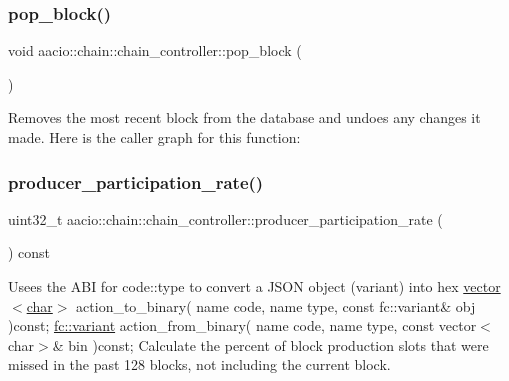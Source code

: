 \subsubsection{\texorpdfstring{pop\+\_\+block()}{pop\_block()}}
{\footnotesize\ttfamily void aacio\+::chain\+::chain\+\_\+controller\+::pop\+\_\+block (\begin{DoxyParamCaption}{ }\end{DoxyParamCaption})}

Removes the most recent block from the database and undoes any changes it made. Here is the caller graph for this function\+:
\mbox{\label{classaacio_1_1chain_1_1chain__controller_a524ad0811937cfc85d2492875c76f1fa}} 
\subsubsection{\texorpdfstring{producer\+\_\+participation\+\_\+rate()}{producer\_participation\_rate()}}
{\footnotesize\ttfamily uint32\+\_\+t aacio\+::chain\+::chain\+\_\+controller\+::producer\+\_\+participation\+\_\+rate (\begin{DoxyParamCaption}{ }\end{DoxyParamCaption}) const}

Usees the A\+BI for code\+::type to convert a J\+S\+ON object (variant) into hex \mbox{\hyperlink{classstd_1_1vector}{vector$<$char$>$}} action\+\_\+to\+\_\+binary( name code, name type, const fc\+::variant\& obj )const; \mbox{\hyperlink{classfc_1_1variant}{fc\+::variant}} action\+\_\+from\+\_\+binary( name code, name type, const vector$<$char$>$\& bin )const; Calculate the percent of block production slots that were missed in the past 128 blocks, not including the current block. \mbox{\label{classaacio_1_1chain_1_1chain__controller_a23d273b6ef29d0c5c9f9f0bf61774024}} 
